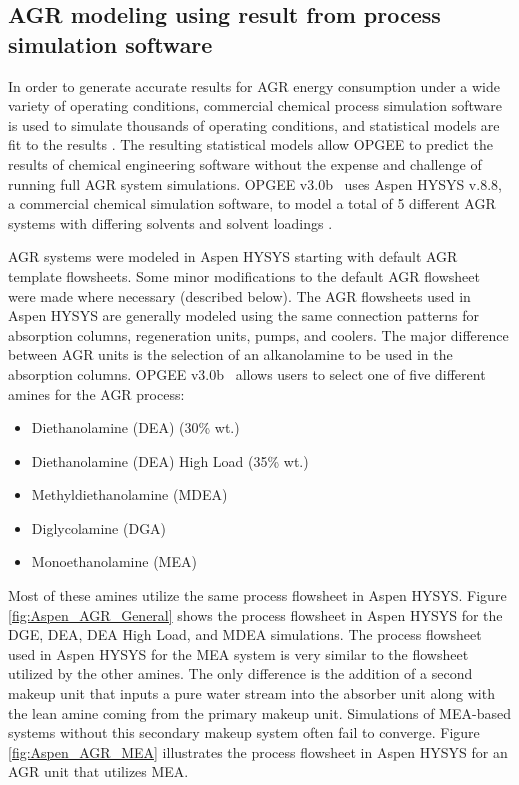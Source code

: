 \documentclass[11pt]{report}
\newcommand{\version}{v3.0b }
\begin{document}
\subsection{AGR modeling using result from process simulation software} \label{AGRaspen}


In order to generate accurate results for AGR energy consumption under a wide variety of operating conditions, commercial chemical process simulation software is used to simulate thousands of operating conditions, and statistical models are fit to the results \cite{Masnadi2020}. The resulting statistical models allow OPGEE to predict the results of chemical engineering software without the expense and challenge of running full AGR system simulations. OPGEE \version \, uses Aspen HYSYS v.8.8, a commercial chemical simulation software, to model a total of 5 different AGR systems with differing solvents and solvent loadings \cite{Aspentech2016}. 

AGR systems were modeled in Aspen HYSYS starting with default AGR template flowsheets. Some minor modifications to the default AGR flowsheet were made where necessary (described below). The AGR flowsheets used in Aspen HYSYS are generally modeled using the same connection patterns for absorption columns, regeneration units, pumps, and coolers. The major difference between AGR units is the selection of an alkanolamine to be used in the absorption columns. OPGEE \version \, allows users to select one of five different amines for the AGR process:
\begin{itemize}
 \item Diethanolamine (DEA) (30\% wt.)
\item Diethanolamine (DEA) High Load (35\% wt.)
 \item Methyldiethanolamine (MDEA)
\item Diglycolamine (DGA)
\item Monoethanolamine (MEA)
\end{itemize}
Most of these amines utilize the same process flowsheet in Aspen HYSYS. Figure \ref{fig:Aspen_AGR_General} shows the process flowsheet in Aspen HYSYS for the DGE, DEA, DEA High Load, and MDEA simulations.  The process flowsheet used in Aspen HYSYS for the MEA system is very similar to the flowsheet utilized by the other amines. The only difference is the addition of a second makeup unit that inputs a pure water stream into the absorber unit along with the lean amine coming from the primary makeup unit. Simulations of MEA-based systems without this secondary makeup system often fail to converge. Figure \ref{fig:Aspen_AGR_MEA} illustrates the process flowsheet in Aspen HYSYS for an AGR unit that utilizes MEA.
\end{document}
